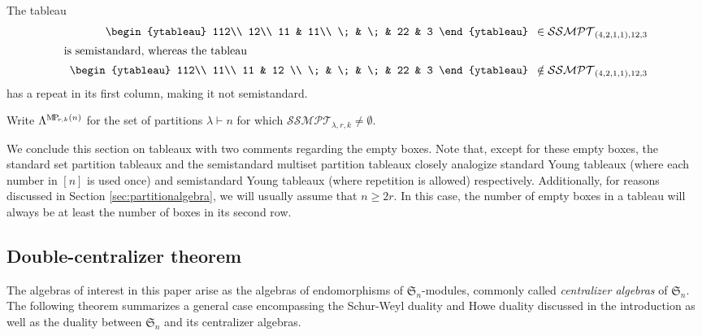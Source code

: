 \documentclass[ALCO,Unicode,published]{cedram}
\newcommand{\SG}{\mathfrak{S}}
\newcommand{\MP}{{\rm M\!P\!}}
\newcommand{\SSMPT}{\mathcal{SSMPT}}
\newcommand{\inline}[1]{\begin{array}{c}#1\end{array}}
\newcommand{\defn}[1]{\textcolor{defncolor}{\emph{#1}}}
\begin{document}
\begin{exam} The tableau
    \begin{align*}
        \inline{\begin{ytableau}
        112\\
        12\\
        11 & 11\\
        \; & \; & 22 & 3
\end{ytableau}}&\in \SSMPT_{(4,2,1,1),12,3}\\
        \intertext{is semistandard, whereas the tableau}
        \inline{\begin{ytableau}
        112\\
        11\\
        11 & 12 \\
        \; & \; & \; & 22 & 3
\end{ytableau}}&\notin \SSMPT_{(4,2,1,1),12,3}
    \end{align*} has a repeat in its first column, making it not semistandard.
\end{exam}

Write $\Lambda^{\MP_{r,k}(n)}$ for the set of partitions $\lambda\vdash n$ for which $\SSMPT_{\lambda,r,k}\neq\emptyset$. 

\begin{rema} We conclude this section on tableaux with two comments regarding the empty boxes. Note that, except for these empty boxes, the standard set partition tableaux and the semistandard multiset partition tableaux closely analogize standard Young tableaux (where each number in $[n]$ is used once) and semistandard Young tableaux (where repetition is allowed) respectively. Additionally, for reasons discussed in Section \ref{sec:partitionalgebra}, we will usually assume that $n\geq2r$. In this case, the number of empty boxes in a tableau will always be at least the number of boxes in its second row.
\end{rema}

\subsection{Double-centralizer theorem}

The algebras of interest in this paper arise as the algebras of endomorphisms of $\SG_n$-modules, commonly called \defn{centralizer algebras} of $\SG_n$. The following theorem summarizes a general case encompassing the Schur-Weyl duality and Howe duality discussed in the introduction as well as the duality between $\SG_n$ and its centralizer algebras.
\end{document}
